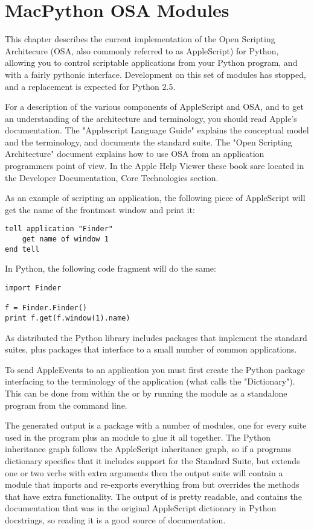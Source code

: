 \chapter{MacPython OSA Modules \label{scripting}}

This chapter describes the current implementation of the Open Scripting
Architecure (OSA, also commonly referred to as AppleScript) for Python, allowing
you to control scriptable applications from your Python program,
and with a fairly pythonic interface. Development on this set of modules
has stopped, and a replacement is expected for Python 2.5.

For a description of the various components of AppleScript and OSA, and
to get an understanding of the architecture and terminology, you should
read Apple's documentation. The "Applescript Language Guide" explains
the conceptual model and the terminology, and documents the standard
suite. The "Open Scripting Architecture" document explains how to use
OSA from an application programmers point of view. In the Apple Help
Viewer these book sare located in the Developer Documentation, Core
Technologies section.


As an example of scripting an application, the following piece of
AppleScript will get the name of the frontmost  window
and print it:
	
\begin{verbatim}
tell application "Finder"
    get name of window 1
end tell
\end{verbatim}

In Python, the following code fragment will do the same:

\begin{verbatim}
import Finder

f = Finder.Finder()
print f.get(f.window(1).name)
\end{verbatim}

As distributed the Python library includes packages that implement the
standard suites, plus packages that interface to a small number of
common applications.

To send AppleEvents to an application you must first create the Python
package interfacing to the terminology of the application (what
 calls the "Dictionary"). This can be done from
within the  or by running the
 module as a standalone program from the command
line.

The generated output is a package with a number of modules, one for
every suite used in the program plus an  module to glue
it all together. The Python inheritance graph follows the AppleScript
inheritance graph, so if a programs dictionary specifies that it
includes support for the Standard Suite, but extends one or two verbs
with extra arguments then the output suite will contain a module
 that imports and re-exports everything from
 but overrides the methods that have
extra functionality. The output of  is pretty
readable, and contains the documentation that was in the original
AppleScript dictionary in Python docstrings, so reading it is a good
source of documentation.

